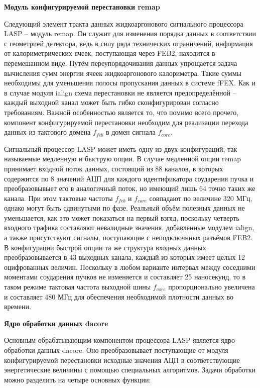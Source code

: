 \textbf{Модуль конфигурируемой перестановки remap}\par
Следующий элемент тракта данных жидкоаргонового сигнального процессора LASP -- модуль remap. Он служит для изменения порядка данных в соответствии с геометрией детектора, ведь в силу ряда технических ограничений, информация от калориметрических ячеек, поступающая через FEB2, находится в перемешанном виде. Путём переупорядочивания данных упрощается задача вычисления сумм энергии ячеек жидкоаргонового калориметра. Такие суммы необходимы для уменьшения полосы пропускания данных в системе fFEX. Как и в случае модуля ialign схема перестановки не является предопределённой -- каждый выходной канал может быть гибко сконфигурирован согласно требованиям. Важной особенностью является то, что помимо всего прочего, компонент конфигурируемой перестановки необходим для реализации перехода данных из тактового домена $f_{feb}$ в домен сигнала $f_{core}$.\par
Сигнальный процессор LASP может иметь одну из двух конфигураций, так называемые медленную и быструю опции. В случае медленной опции remap принимает входной поток данных, состоящий из 88 каналов, в которых содержится по 8 значений АЦП для каждого идентификатора соударения пучка и преобразовывыет его в аналогичный поток, но имеющий лишь 64 точно таких же канала. При этом тактовые частоты $f_{feb}$ и $f_{core}$ совпадают по величине 320 МГц, однако могут быть сдвинутыми по фазе. Реальный объём полезных данных не уменьшается, как это может показаться на первый взгяд, поскольку четверть входного трафика составляют невалидные значения, добавленные модулем ialign, а также присутствуют сигналы, поступающие с неподключнных разъёмов FEB2. В конфигурации быстрой опции та же структура входных данных преобразовывается в 43 выходных канала, каждый из которых имеет целых 12 оцифрованных величин. Поскольку в любом варианте интервал между соседними моментами соударения пучков не изменяется и составляет 25 наносекунд, то в таком режиме тактовая частота выходной шины $f_{core}$ пропорционально увеличена и составляет 480 МГц для обеспечения необходимой плотности данных во времени.\par
\textbf{Ядро обработки данных dacore}\par
Основным обрабатывающим компонентом процессора LASP является ядро обработки данных dacore. Оно преобразовывает поступающие от модуля конфигурируемой перестановки исходные значения АЦП в соответствующие энергетические величины с помощью специальных алгоритмов. Задачи обработки можно разделить на четыре основных функции:\par
